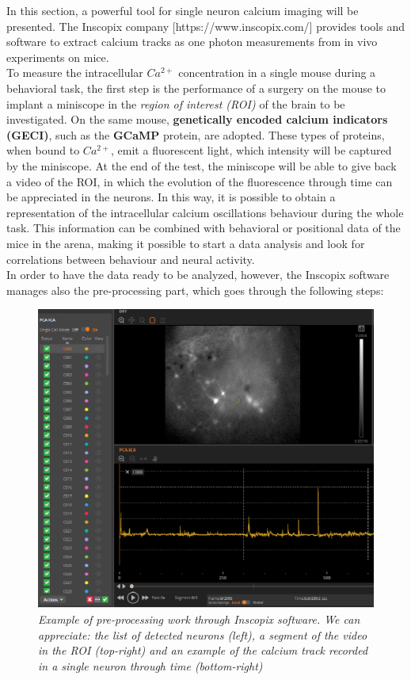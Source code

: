 \documentclass[a4paper]{article}
\begin{document}
In this section, a powerful tool for single neuron calcium imaging will be presented. The Inscopix company [https://www.inscopix.com/] provides tools and software to extract calcium tracks as one photon measurements from in vivo experiments on mice.\\
To measure the intracellular $Ca^{2+}$ concentration in a single mouse during a behavioral task, the first step is the performance of a surgery on the mouse to implant a miniscope in the \textit{region of interest (ROI)} of the brain to be investigated. On the same mouse, \textbf{genetically encoded calcium indicators (GECI)}, such as the \textbf{GCaMP} protein, are adopted. These types of proteins, when bound to $Ca^{2+}$, emit a fluorescent light, which intensity will be captured by the miniscope. At the end of the test, the miniscope will be able to give back a video of the ROI, in which the evolution of the fluorescence through time can be appreciated  in the neurons. In this way, it is possible to obtain a representation of the intracellular calcium oscillations behaviour during the whole task. This information can be combined with behavioral or positional data of the mice in the arena, making it possible to start a data analysis and look for correlations between behaviour and neural activity.\\
In order to have the data ready to be analyzed, however, the Inscopix software manages also the pre-processing part, which goes through the following steps:

\begin{figure}[H]
	\begin{center}
		\includegraphics[scale=.70]{Inscopix2.png} 
	\end{center} 
	\caption{\textit{Example of pre-processing work through Inscopix software. We can appreciate: the list of detected neurons (left), a segment of the video in the ROI (top-right) and an example of the calcium track recorded in a single neuron through time (bottom-right)}}
	
\end{figure}
\end{document}
